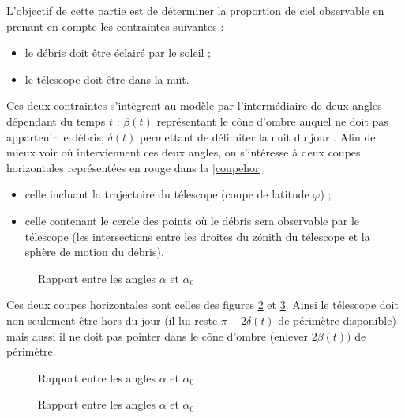 \documentclass[a4paper,11pt]{article}
\numberwithin{section}{part}
\begin{document}
L'objectif de cette partie est de d\'eterminer la proportion de ciel observable en prenant en compte les contraintes suivantes : 
\begin{itemize}
\item le d\'ebris doit \^etre \'eclair\'e par le soleil ;
\item le t\'elescope doit \^etre dans la nuit.
\end{itemize}
Ces deux contraintes s'int\`egrent au mod\`ele par l'interm\'ediaire de deux angles d\'ependant du temps $t$ : $\beta(t)$ repr\'esentant le c\^one d'ombre auquel ne doit pas appartenir le d\'ebris, $\delta(t)$ permettant de d\'elimiter la nuit du jour . Afin de mieux voir o\`u interviennent ces deux angles, on s'int\'eresse \`a deux coupes horizontales repr\'esent\'ees en rouge dans la \autoref{coupehor}:
\begin{itemize}
\item celle incluant la trajectoire du t\'elescope (coupe de latitude $\varphi$) ;
\item celle contenant le cercle des points o\`u le d\'ebris sera observable par le t\'elescope (les intersections entre les droites du z\'enith du t\'elescope et la sph\`ere de motion du d\'ebris).
\end{itemize}
\begin{figure}
\begin{center}
\scriptsize
\def\figurewidth{0.6\linewidth}

\caption{Rapport entre les angles $\alpha$ et $\alpha_0$} \label{coupehor}
\end{center}
\end{figure}
Ces deux coupes horizontales sont celles des figures \ref{coupehorbeta} et \ref{coupehordelta}. Ainsi le t\'elescope doit non seulement \^etre hors du jour (il lui reste $\pi-2\delta(t)$ de p\'erim\`etre disponible) mais aussi il ne doit pas pointer dans le c\^one d'ombre (enlever $2\beta(t))$ de p\'erim\`etre.
\begin{figure}
\begin{center}
\scriptsize
\def\figurewidth{0.6\linewidth}

\caption{Rapport entre les angles $\alpha$ et $\alpha_0$} \label{coupehorbeta}
\end{center}
\end{figure}
\begin{figure}
\begin{center}
\scriptsize
\def\figurewidth{0.6\linewidth}

\caption{Rapport entre les angles $\alpha$ et $\alpha_0$} \label{coupehordelta}
\end{center}
\end{figure}
\end{document}
